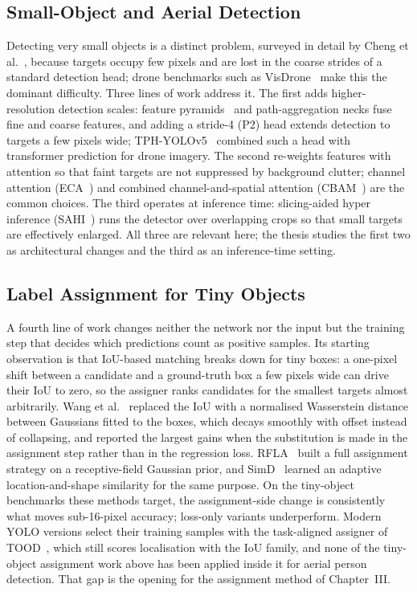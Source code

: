 \subsection{Small-Object and Aerial Detection}
Detecting very small objects is a distinct problem, surveyed in detail by Cheng et
al.~\cite{cheng2023smallobject}, because targets occupy few pixels and are lost in
the coarse strides of a standard detection head; drone benchmarks such as
VisDrone~\cite{zhu2021visdrone} make this the dominant difficulty. Three lines of
work address it. The first adds higher-resolution detection scales: feature
pyramids~\cite{lin2017fpn} and path-aggregation necks fuse fine and coarse features,
and adding a stride-4 (P2) head extends detection to targets a few pixels wide;
TPH-YOLOv5~\cite{zhu2021tphyolov5} combined such a head with transformer prediction
for drone imagery. The second re-weights features with attention so that faint
targets are not suppressed by background clutter; channel attention
(ECA~\cite{wang2020eca}) and combined channel-and-spatial attention
(CBAM~\cite{woo2018cbam}) are the common choices. The third operates at inference
time: slicing-aided hyper inference (SAHI~\cite{akyon2022sahi}) runs the detector
over overlapping crops so that small targets are effectively enlarged. All three are
relevant here; the thesis studies the first two as architectural changes and the
third as an inference-time setting.

\subsection{Label Assignment for Tiny Objects}
A fourth line of work changes neither the network nor the input but the training
step that decides which predictions count as positive samples. Its starting
observation is that IoU-based matching breaks down for tiny boxes: a one-pixel
shift between a candidate and a ground-truth box a few pixels wide can drive
their IoU to zero, so the assigner ranks candidates for the smallest targets
almost arbitrarily. Wang et al.~\cite{wang2021nwd} replaced the IoU with a
normalised Wasserstein distance between Gaussians fitted to the boxes, which
decays smoothly with offset instead of collapsing, and reported the largest
gains when the substitution is made in the assignment step rather than in the
regression loss. RFLA~\cite{xu2022rfla} built a full assignment strategy on a
receptive-field Gaussian prior, and SimD~\cite{shi2024simd} learned an adaptive
location-and-shape similarity for the same purpose. On the tiny-object
benchmarks these methods target, the assignment-side change is consistently
what moves sub-16-pixel accuracy; loss-only variants underperform. Modern YOLO
versions select their training samples with the task-aligned assigner of
TOOD~\cite{feng2021tood}, which still scores localisation with the IoU family,
and none of the tiny-object assignment work above has been applied inside it
for aerial person detection. That gap is the opening for the assignment method
of Chapter~III.

